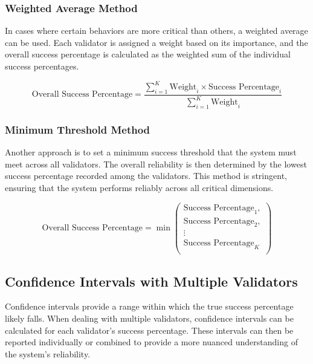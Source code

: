 \documentclass{article}
\begin{document}
\subsubsection{Weighted Average Method}

In cases where certain behaviors are more critical than others, a weighted average can be used. Each validator is assigned a weight based on its importance, and the overall success percentage is calculated as the weighted sum of the individual success percentages.

\begin{equation*}
\text{Overall Success Percentage} = \frac{\sum_{i=1}^{K} \text{Weight}_i \times \text{Success Percentage}_i}{\sum_{i=1}^{K} \text{Weight}_i}
\end{equation*}

\subsubsection{Minimum Threshold Method}

Another approach is to set a minimum success threshold that the system must meet across all validators. The overall reliability is then determined by the lowest success percentage recorded among the validators. This method is stringent, ensuring that the system performs reliably across all critical dimensions.

\begin{equation*}
\text{Overall Success Percentage} = \min \left( \begin{array}{c}
\text{Success Percentage}_1, \\
\text{Success Percentage}_2, \\
\vdots \\
\text{Success Percentage}_K \\
\end{array} \right)
\end{equation*}


\subsection{Confidence Intervals with Multiple Validators}

Confidence intervals provide a range within which the true success percentage likely falls. When dealing with multiple validators, confidence intervals can be calculated for each validator’s success percentage. These intervals can then be reported individually or combined to provide a more nuanced understanding of the system’s reliability.
\end{document}
